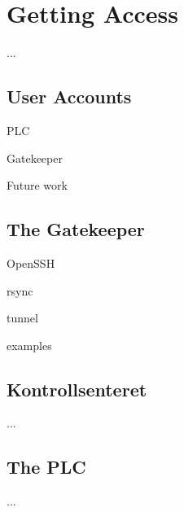 \chapter{Getting Access}
\label{cha:Getting-Access}

...

\section{User Accounts}
\label{sec:User-Accounts}

PLC

Gatekeeper

Future work



\section{The Gatekeeper}
\label{sec:The-Gatekeeper}

OpenSSH

rsync

tunnel

examples



\section{Kontrollsenteret}
\label{sec:Kontrollsenteret}

...



\section{The PLC}
\label{sec:The-PLC}

...

